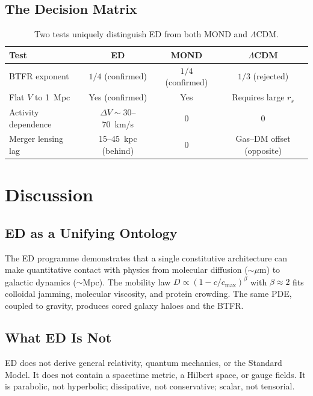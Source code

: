 \documentclass[12pt,letterpaper]{article}
\begin{document}
\subsection{The Decision Matrix}

\begin{table}[H]
\centering
\begin{tabular}{@{}lccc@{}}
\toprule
Test & ED & MOND & $\Lambda$CDM \\
\midrule
BTFR exponent & $1/4$ (confirmed) & $1/4$ (confirmed) & $1/3$ (rejected) \\
Flat $V$ to 1~Mpc & Yes (confirmed) & Yes & Requires large $r_s$ \\
Activity dependence & $\Delta V \sim 30$--70~km/s & 0 & 0 \\
Merger lensing lag & 15--45~kpc (behind) & 0 & Gas--DM offset (opposite) \\
\bottomrule
\end{tabular}
\caption{Two tests uniquely distinguish ED from both MOND and $\Lambda$CDM.}
\end{table}

\section{Discussion}

\subsection{ED as a Unifying Ontology}

The ED programme demonstrates that a single constitutive architecture can make quantitative contact with physics from molecular diffusion ($\sim\mu$m) to galactic dynamics ($\sim$Mpc). The mobility law $D \propto (1-c/c_{\max})^\beta$ with $\beta \approx 2$ fits colloidal jamming, molecular viscosity, and protein crowding. The same PDE, coupled to gravity, produces cored galaxy haloes and the BTFR.

\subsection{What ED Is Not}

ED does not derive general relativity, quantum mechanics, or the Standard Model. It does not contain a spacetime metric, a Hilbert space, or gauge fields. It is parabolic, not hyperbolic; dissipative, not conservative; scalar, not tensorial.
\end{document}

